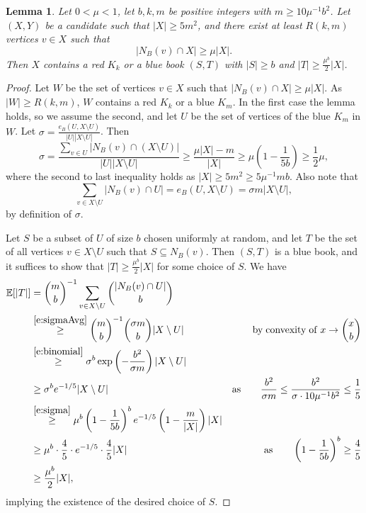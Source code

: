 \documentclass[reqno,final,12pt]{amsart}
\newtheorem{lem}[thm]{Lemma}
\newcommand{\bb}[1]{\mathbb{#1}}
\newcommand{\s}[1]{\left(#1\right)}
\begin{document}
\begin{lem}\label{l:BBook}
	Let $0< \mu < 1$, let $b,k,m$ be positive integers  with $m \geq 10\mu^{-1}b^2$. Let $(X,Y)$ be a candidate such that $|X| \geq 5m^2$, and there exist at least $R(k,m)$ vertices $v \in X$ such that 
	$$ |N_B(v) \cap X| \geq \mu|X|.$$
	Then $X$ contains a red $K_k$ or a blue book $(S,T)$ with $|S| \geq b$ and $|T| \geq  \frac{\mu^b}{2}|X|$.
\end{lem}

\begin{proof}
	Let $W$ be the set of vertices $v \in X$ such that 	$ |N_B(v) \cap X| \geq \mu|X|.$ As $|W| \geq R(k,m)$, $W$ contains a  red $K_k$ or a blue $K_m$. In the first case the lemma holds, so we assume the second, and  let $U$ be the set of vertices of the blue $K_m$  in $W$. Let $\sigma = \frac{e_B(U,X\setminus U)}{|U||X \setminus U|}$. Then  \begin{equation}\label{e:sigma} \sigma = \frac{ \sum_{v \in U} |N_B(v) \cap (X \setminus U)|}{|U||X \setminus U|} \geq  \frac{\mu|X|-m}{|X|}  \geq \mu \s{1- \frac{1}{5b}} \geq \frac{1}{2}\mu,\end{equation}
	where the second to last inequality holds as $|X| \geq 5m^2 \geq  5\mu^{-1}mb$.
	Also note that \begin{equation}\label{e:sigmaAvg}\sum_{v \in X \setminus U}|N_B(v) \cap U| =  e_B(U,X\setminus U) = \sigma m |X \setminus U|,\end{equation}
	by definition of $\sigma$.
	
	Let $S$ be a subset of $U$ of size $b$ chosen uniformly at random, and let $T$ be the set of all vertices  $v \in X \setminus U$ such that $S \subseteq N_B(v)$. Then $(S,T)$ is a blue book, and it suffices to show that $|T| \geq  \frac{\mu^b}{2}|X|$ for some choice of $S$.  We have \begin{align*}\bb{E}[|T|] &=\binom{m}{b}^{-1}\sum_{v \in X \setminus U}\binom{|N_B(v) \cap U|}{b} \\ &\stackrel{\eqref{e:sigmaAvg}}{\geq} \binom{m}{b}^{-1}\binom{\sigma m}{b}|X \setminus U|  &\mathrm{by \;convexity\; of}\; x \to \binom{x}{b} \\ & \stackrel{\eqref{e:binomial}}{\geq} \sigma^b\exp\s{-\frac{b^2}{\sigma m}}|X \setminus U| \\ &\geq \sigma^b e^{-1/5}|X \setminus U| & \mathrm{as}\qquad \frac{b^2}{\sigma m} \leq \frac{b^2}{\sigma \cdot 10 \mu^{-1}b^2} \leq \frac{1}{5} \\ &\stackrel{\eqref{e:sigma}}{\geq}  \mu^b\s{1- \frac{1}{5b}}^b  e^{-1/5}\s{1-\frac{m}{|X|}}|X| \\ &\geq \mu^b \cdot \frac{4}{5} \cdot e^{-1/5} \cdot \frac{4}{5}|X|  & \mathrm{as}\qquad \s{1- \frac{1}{5b}}^b  \geq \frac{4}{5}  \\ &\geq \frac{\mu^b}{2}|X|, \end{align*}
implying the existence of the desired choice of $S$.
\end{proof}	
\end{document}
